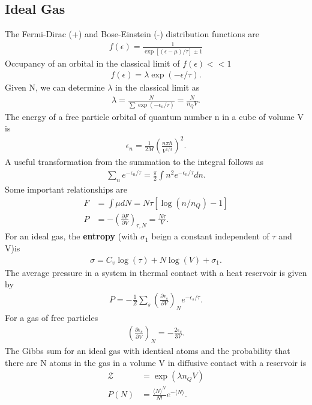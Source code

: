 \begin{multicols}{2}
	\section{Ideal Gas}
	The Fermi-Dirac (+) and Bose-Einstein (-) distribution functions are
	\begin{align}
	f(\epsilon) = \frac{1}{\exp[(\epsilon-\mu)/\tau]\pm 1}
	\end{align}
	Occupancy of an orbital in the classical limit of $f(\epsilon) << 1$
	\begin{align}
	f(\epsilon) = \lambda \exp(-\epsilon/\tau).
	\end{align}
	Given N, we can determine $\lambda$ in the classical limit as
	\begin{align}
	\lambda = \frac{N}{\sum \exp(-\epsilon_n/\tau)} = \frac{N}{n_Q V}.
	\end{align}
	The energy of a free particle orbital of quantum number n in a cube of volume V is
	\begin{align}
	\epsilon_n = \frac{1}{2M}\left(\frac{n \pi \hbar}{V^{1/3}}\right)^2.
	\end{align}
	A useful transformation from the summation to the integral follows as
	\begin{align}
	\sum_n e^{-\epsilon_n/\tau} = \frac{\pi}{2}\int n^2 e^{-\epsilon_n/\tau} dn.
	\end{align}
	Some important relationships are
	\begin{align}
	F &= \int \mu dN = N\tau[\log(n/n_Q)-1] \\
	P&= -\left(\frac{\partial F}{\partial V}\right)_{\tau,N} = \frac{N\tau}{V}.
	\end{align}
	For an ideal gas, the \textbf{entropy} (with $\sigma_1$ beign a constant independent of $\tau$ and V)is
	\begin{align}
	\sigma = C_v \log(\tau)+N\log(V)+\sigma_1.
	\end{align}
	The average pressure in a system in thermal contact with a heat reservoir is given by 
	\begin{align}
	P= -\frac{1}{Z}\sum_s \left(\frac{\partial \epsilon_s}{\partial  V}\right)_N e^{-\epsilon_s/\tau}.
	\end{align}
	For a gas of free particles
	\begin{align}
	\left(\frac{\partial \epsilon_s}{\partial  V}\right)_N = -\frac{2\epsilon_s}{3V}.
	\end{align}
	The Gibbs sum for an ideal gas with identical atoms and the probability that there are N atoms in the gas in a volume V in diffusive contact with a reservoir is
	\begin{align}
	\mathcal{Z} &= \exp(\lambda n_Q V) \\
	P(N) &= \frac{\langle N \rangle^N}{N!} e^{-\langle N \rangle}.
	\end{align}
	

\end{multicols}
